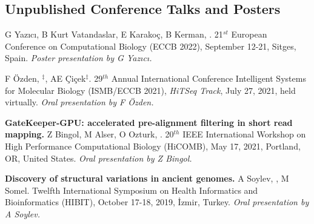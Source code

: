 

    

\vspace{-.4cm}
\subsection{\small \sc  Unpublished Conference Talks and Posters}

\vspace{-.2cm}{\bf Identification of protein-protein interaction
bridges in multiple sclerosis.} G Yazıcı, B Kurt Vatandaslar, E Karakoç, B Kerman, \calkan{}.
21$^{st}$ European Conference on Computational Biology (ECCB 2022), September 12-21, Sitges, Spain. 
{\it Poster presentation by G Yazıcı.}

\vspace{-.2cm}{\bf Polishing copy number variant calls on exome sequencing data via deep learning.}
F Özden, \calkan{}$^\ddag$, AE Çiçek$^\ddag$. 29$^{th}$ Annual
International Conference Intelligent Systems for Molecular Biology (ISMB/ECCB 2021), {\em HiTSeq Track},
 July 27, 2021, held virtually. {\it Oral presentation by F Özden.}


\vspace{-.2cm}
{\bf GateKeeper-GPU: accelerated pre-alignment filtering in short read mapping.} Z Bingol, M Alser, O Ozturk, \calkan{}. 20$^{th}$ IEEE International Workshop on High Performance Computational Biology (HiCOMB), May 17, 2021, Portland, OR, United States.
{\it Oral presentation by Z Bingol.}

\vspace{-.2cm}
{\bf Discovery of structural variations in ancient genomes.}
A Soylev, \calkan{}, M Somel. 
Twelfth International Symposium on Health Informatics and Bioinformatics (HIBIT), October 17-18, 2019, İzmir, Turkey.
       {\it Oral presentation by A Soylev.}
       
